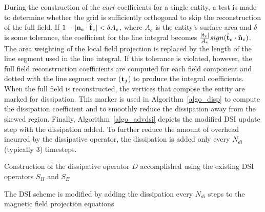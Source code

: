 \documentclass[12pt]{article}
\begin{document}
During the construction of the $curl$ coefficients for a single
entity, a test is made to determine whether the grid is sufficiently
orthogonal to skip the reconstruction of the full field.  If $1-|{\bf
n}_e\cdot\hat{\bf t}_e|<\delta A_e$, where $A_e$ is the entity's
surface area and $\delta$ is some tolerance, the coefficient for the
line integral becomes $\frac{|{\bf t}_e|}{A_e}sign({\hat{\bf
t}_e\cdot\hat{\bf n}_e})$.  The area weighting of the local field
projection is replaced by the length of the line segment used in the
line integral.  If this tolerance is violated, however, the full field
reconstruction coefficients are computed for each field component and
dotted with the line segment vector (${\bf t}_j$) to produce the
integral coefficients.  When the full field is reconstructed, the
vertices that compose the entity are marked for dissipation.  This
marker is used in Algorithm~\ref{algo_disp} to compute the dissipation
coefficient and to smoothly reduce the dissipation away from the
skewed region. Finally, Algorithm~\ref{algo_advdsi} depicts the
modified DSI update step with the dissipation added. To further reduce
the amount of overhead incurred by the dissipative operator, the
dissipation is added only every $N_{di}$ (typically $3$) timesteps.

\begin{algorithm}%
\dontprintsemicolon
{}
\label{algo_disp}
\caption{Construction of the dissipative operator $D$ accomplished using the existing DSI operators $S_H$ and $S_E$}
\end{algorithm}

\begin{algorithm}
\dontprintsemicolon
{}
\label{algo_advdsi}
\caption{The DSI scheme is modified by adding the dissipation every $N_{di}$ steps to the magnetic field projection equations}
\end{algorithm}
  
\end{document}
